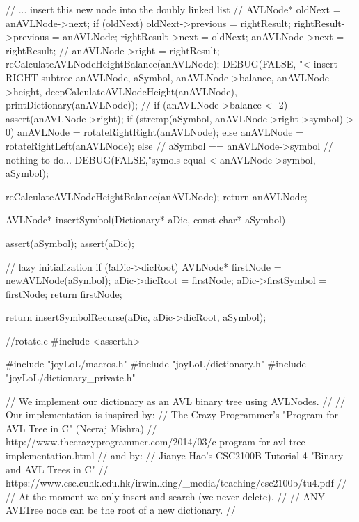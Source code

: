 {{{      // ... insert this new node into the doubly linked list
      //
      AVLNode* oldNext               = anAVLNode->next;
      if (oldNext) oldNext->previous = rightResult;
      rightResult->previous          = anAVLNode;
      rightResult->next              = oldNext;
      anAVLNode->next                = rightResult;
      //
    }
    anAVLNode->right = rightResult;
    reCalculateAVLNodeHeightBalance(anAVLNode);
    DEBUG(FALSE, "<-insert RIGHT subtree %
        anAVLNode, aSymbol, anAVLNode->balance,
        anAVLNode->height, deepCalculateAVLNodeHeight(anAVLNode),
        printDictionary(anAVLNode));
    //
    if (anAVLNode->balance < -2) {
      assert(anAVLNode->right);
      if (strcmp(aSymbol, anAVLNode->right->symbol) > 0) {
        anAVLNode = rotateRightRight(anAVLNode);
      } else {
        anAVLNode = rotateRightLeft(anAVLNode);
      }
    }
  } else {
    // aSymbol == anAVLNode->symbol // nothing to do...
    DEBUG(FALSE,"symols equal <%
          anAVLNode->symbol, aSymbol);
  }

  reCalculateAVLNodeHeightBalance(anAVLNode);
  return anAVLNode;
}

AVLNode* insertSymbol(Dictionary* aDic, const char* aSymbol) {
  assert(aSymbol);
  assert(aDic);

  // lazy initialization
  if (!aDic->dicRoot) {
    AVLNode* firstNode = newAVLNode(aSymbol);
    aDic->dicRoot     = firstNode;
    aDic->firstSymbol = firstNode;
    return firstNode;
  }

  return insertSymbolRecurse(aDic, aDic->dicRoot, aSymbol);
}

\stoptyping

\starttyping
//rotate.c
#include <assert.h>

#include "joyLoL/macros.h"
#include "joyLoL/dictionary.h"
#include "joyLoL/dictionary_private.h"

// We implement our dictionary as an AVL binary tree using AVLNodes.
//
// Our implementation is inspired by:
// The Crazy Programmer's "Program for AVL Tree in C" (Neeraj Mishra)
// http://www.thecrazyprogrammer.com/2014/03/c-program-for-avl-tree-implementation.html
// and by:
// Jianye Hao's CSC2100B Tutorial 4 "Binary and AVL Trees in C"
// https://www.cse.cuhk.edu.hk/irwin.king/_media/teaching/csc2100b/tu4.pdf
//
// At the moment we only insert and search (we never delete).
//
// ANY AVLTree node can be the root of a new dictionary.
//

